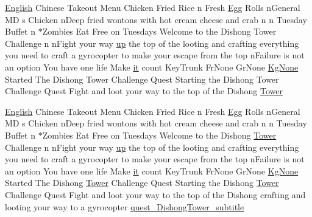 \begin{DoxyCompactItemize}
\item 
\mbox{\hyperlink{_sphere_i_i_01_winter_01_project_2_config_2_localization_8txt_ad896b63205779b1b09e86d941ce13976}{English}} Chinese Takeout Menu Chicken Fried Rice n Fresh \mbox{\hyperlink{_sphere_i_i_01_winter_01_project_2_config_2_localization_8txt_a55334ab0b48a68a93004334728020f15}{Egg}} Rolls n\+General MD s Chicken n\+Deep fried wontons with hot cream cheese and crab n n Tuesday Buffet n $\ast$Zombies Eat Free on Tuesdays Welcome to the Dishong Tower Challenge n n\+Fight your way \mbox{\hyperlink{_the_01_restless_01_curse_2_config_2_localization_01-_01_quest_8txt_a2f8d5a9cc6c08e259de10d34d28f85c4}{up}} the top of the looting and crafting everything you need to craft a gyrocopter to make your escape from the top n\+Failure is not an option You have one life Make \mbox{\hyperlink{_the_01_restless_01_curse_2_config_2_localization_01-_01_quest_8txt_a741b285909bea4855b886664c2dcd50c}{it}} count Key\+Trunk Fr\+None Gr\+None \mbox{\hyperlink{_the_01_restless_01_curse_2_config_2_localization_8txt_acc1c43e0980c5828bcfaf85313744919}{Kg\+None}} Started The Dishong Tower Challenge Quest Starting the Dishong Tower Challenge Quest Fight and loot your way to the top of the Dishong \mbox{\hyperlink{_dishong_01_tower_01_challenge_2_config_2_localization_8txt_ad03a7286db82f171f8e82a1eaf4e3eaf}{Tower}}
\item 
\mbox{\hyperlink{_sphere_i_i_01_winter_01_project_2_config_2_localization_8txt_ad896b63205779b1b09e86d941ce13976}{English}} Chinese Takeout Menu Chicken Fried Rice n Fresh \mbox{\hyperlink{_sphere_i_i_01_winter_01_project_2_config_2_localization_8txt_a55334ab0b48a68a93004334728020f15}{Egg}} Rolls n\+General MD s Chicken n\+Deep fried wontons with hot cream cheese and crab n n Tuesday Buffet n $\ast$Zombies Eat Free on Tuesdays Welcome to the Dishong \mbox{\hyperlink{_dishong_01_tower_01_challenge_2_config_2_localization_8txt_ad03a7286db82f171f8e82a1eaf4e3eaf}{Tower}} Challenge n n\+Fight your way \mbox{\hyperlink{_the_01_restless_01_curse_2_config_2_localization_01-_01_quest_8txt_a2f8d5a9cc6c08e259de10d34d28f85c4}{up}} the top of the looting and crafting everything you need to craft a gyrocopter to make your escape from the top n\+Failure is not an option You have one life Make \mbox{\hyperlink{_the_01_restless_01_curse_2_config_2_localization_01-_01_quest_8txt_a741b285909bea4855b886664c2dcd50c}{it}} count Key\+Trunk Fr\+None Gr\+None \mbox{\hyperlink{_the_01_restless_01_curse_2_config_2_localization_8txt_acc1c43e0980c5828bcfaf85313744919}{Kg\+None}} Started The Dishong \mbox{\hyperlink{_dishong_01_tower_01_challenge_2_config_2_localization_8txt_ad03a7286db82f171f8e82a1eaf4e3eaf}{Tower}} Challenge Quest Starting the Dishong \mbox{\hyperlink{_dishong_01_tower_01_challenge_2_config_2_localization_8txt_ad03a7286db82f171f8e82a1eaf4e3eaf}{Tower}} Challenge Quest Fight and loot your way to the top of the Dishong crafting and looting your way to a gyrocopter \mbox{\hyperlink{_dishong_01_tower_01_challenge_2_config_2_localization_8txt_ab2dc17ed289364d20a91e96732489428}{quest\+\_\+\+Dishong\+Tower\+\_\+subtitle}}
\end{DoxyCompactItemize}


